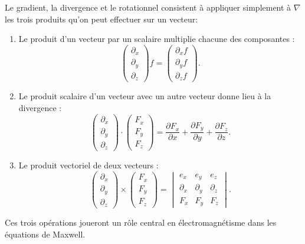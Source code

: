 Le gradient, la divergence et le rotationnel consistent à appliquer simplement à \( \nabla\) les trois produits qu'on peut effectuer sur un vecteur:
\begin{enumerate}
	\item
	      Le produit d'un vecteur par un scalaire multiplie chacune des composantes :
	      \begin{equation}
		      \begin{pmatrix}
			      \partial_x \\
			      \partial_y \\
			      \partial_z
		      \end{pmatrix}f
		      =\begin{pmatrix}
			      \partial_xf \\
			      \partial_yf \\
			      \partial_zf
		      \end{pmatrix}.
	      \end{equation}
	\item
	      Le produit scalaire d'un vecteur avec un autre vecteur donne lieu à la divergence :
	      \begin{equation}
		      \begin{pmatrix}
			      \partial_x \\
			      \partial_y \\
			      \partial_z
		      \end{pmatrix}\cdot
		      \begin{pmatrix}
			      F_x \\
			      F_y \\
			      F_z
		      \end{pmatrix}=
		      \frac{ \partial F_x }{ \partial x }+\frac{ \partial F_y }{ \partial y }+\frac{ \partial F_z }{ \partial z }.
	      \end{equation}
	\item
	      Le produit vectoriel de deux vecteurs :
	      \begin{equation}
		      \begin{pmatrix}
			      \partial_x \\
			      \partial_y \\
			      \partial_z
		      \end{pmatrix}\times\begin{pmatrix}
			      F_x \\
			      F_y \\
			      F_z
		      \end{pmatrix}=
		      \begin{vmatrix}
			      e_x        & e_y        & e_z        \\
			      \partial_x & \partial_y & \partial_z \\
			      F_x        & F_y        & F_z
		      \end{vmatrix}.
	      \end{equation}
\end{enumerate}
Ces trois opérations joueront un rôle central en électromagnétisme dans les équations de Maxwell.

